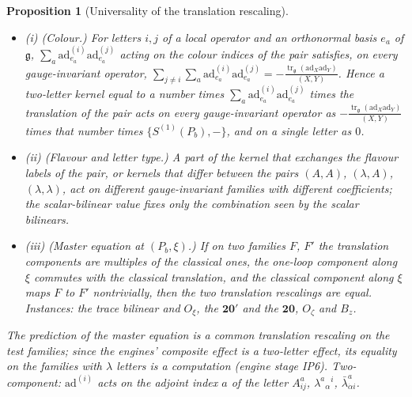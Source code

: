 \documentclass[11pt]{report}
\theoremstyle{plain}
\newtheorem{proposition}[theorem]{Proposition}
\theoremstyle{definition}
\numberwithin{equation}{chapter}
\newcommand{\lam}{\tfrac{\operatorname{tr}_{\mathfrak g}(\mathrm{ad}_X\mathrm{ad}_Y)}{(X,Y)}}
\begin{document}
\begin{proposition}[Universality of the translation rescaling]
\label{prop:ip-universal}
\begin{itemize}
\item (i) (Colour.) For letters $i,j$ of a local operator and an orthonormal basis $e_a$ of $\mathfrak g$, $\sum_a\mathrm{ad}^{(i)}_{e_a}\mathrm{ad}^{(j)}_{e_a}$ acting on the colour indices of the pair satisfies, on every gauge-invariant operator, $\sum_{j\neq i}\sum_a\mathrm{ad}^{(i)}_{e_a}\mathrm{ad}^{(j)}_{e_a}=-\lam$. Hence a two-letter kernel equal to a number times $\sum_a\mathrm{ad}^{(i)}_{e_a}\mathrm{ad}^{(j)}_{e_a}$ times the translation of the pair acts on every gauge-invariant operator as $-\lam$ times that number times $\{S^{(1)}(P_b),-\}$, and on a single letter as $0$.
\item (ii) (Flavour and letter type.) A part of the kernel that exchanges the flavour labels of the pair, or kernels that differ between the pairs $(A,A)$, $(\lambda,A)$, $(\lambda,\lambda)$, act on different gauge-invariant families with different coefficients; the scalar-bilinear value fixes only the combination seen by the scalar bilinears.
\item (iii) (Master equation at $(P_b,\xi)$.) If on two families $F$, $F'$ the translation components are multiples of the classical ones, the one-loop component along $\xi$ commutes with the classical translation, and the classical component along $\xi$ maps $F$ to $F'$ nontrivially, then the two translation rescalings are equal. Instances: the trace bilinear and $O_\xi$, the $\mathbf{20'}$ and the $\mathbf{20}$, $O_\zeta$ and $B_z$.
\end{itemize}
The prediction of the master equation is a common translation rescaling on the test families; since the engines' composite effect is a two-letter effect, its equality on the families with $\lambda$ letters is a computation (engine stage IP6). Two-component: $\mathrm{ad}^{(i)}$ acts on the adjoint index $a$ of the letter $A^a_{ij}$, $\lambda^a{}_\alpha{}^i$, $\bar\lambda^a_{\dot\alpha i}$.
\end{proposition}
\end{document}
